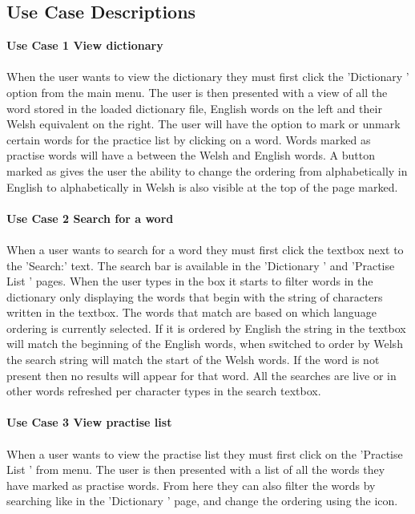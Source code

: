 \documentclass{project}
\newcommand*{\icon}[1]{%
  \raisebox{-.3\baselineskip}{%
    \texttt{[image: \#1]}%
  }%
}
\begin{document}
\subsection{Use Case Descriptions}
\textbf{Use Case 1 View dictionary}
\\\\
When the user wants to view the dictionary they must first click the 'Dictionary \icon{dictionary-icon}' option from the main menu. The user is then presented with a view of all the word stored in the loaded dictionary file, English words on the left and their Welsh equivalent on the right. The user will have the option to mark or unmark certain words for the practice list by clicking on a word. Words marked as practise words will have a \icon{practise-icon} between the Welsh and English words. A button marked as \icon{order-icon} gives the user the ability to change the ordering from alphabetically in English to alphabetically in Welsh is also visible at the top of the page marked.
\\\\
\textbf{Use Case 2 Search for a word}
\\\\
When a user wants to search for a word they must first click the textbox next to the 'Search:' text. The search bar is available in the 'Dictionary \icon{dictionary-icon}' and 'Practise List \icon{practise-icon}' pages. When the user types in the box it starts to filter words in the dictionary only displaying the words that begin with the string of characters written in the textbox. The words that match are based on which language ordering is currently selected. If it is ordered by English the string in the textbox will match the beginning of the English words, when switched to order by Welsh the search string will match the start of the Welsh words. If the word is not present then no results will appear for that word. All the searches are live or in other words refreshed per character types in the search textbox.
\\\\
\textbf{Use Case 3 View practise list}
\\\\
When a user wants to view the practise list they must first click on the 'Practise List \icon{practise-icon}' from menu. The user is then presented with a list of all the words they have marked as practise words. From here they can also filter the words by searching like in the 'Dictionary \icon{dictionary-icon}' page, and change the ordering using the \icon{order-icon} icon. 
\end{document}
